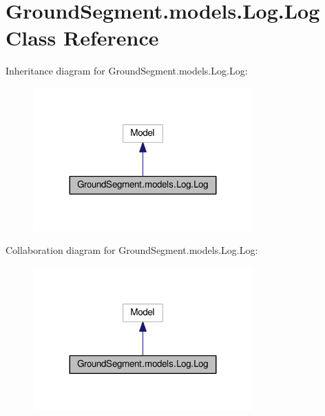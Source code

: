 \hypertarget{class_ground_segment_1_1models_1_1_log_1_1_log}{}\section{Ground\+Segment.\+models.\+Log.\+Log Class Reference}
\label{class_ground_segment_1_1models_1_1_log_1_1_log}


Inheritance diagram for Ground\+Segment.\+models.\+Log.\+Log\+:\nopagebreak
\begin{figure}[H]
\begin{center}
\leavevmode
\includegraphics[width=239pt]{class_ground_segment_1_1models_1_1_log_1_1_log__inherit__graph}
\end{center}
\end{figure}


Collaboration diagram for Ground\+Segment.\+models.\+Log.\+Log\+:\nopagebreak
\begin{figure}[H]
\begin{center}
\leavevmode
\includegraphics[width=239pt]{class_ground_segment_1_1models_1_1_log_1_1_log__coll__graph}
\end{center}
\end{figure}
